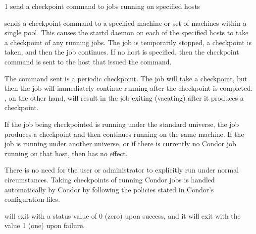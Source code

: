 \begin{ManPage}{\label{man-condor-checkpoint}}{1}
{send a checkpoint command to jobs running on specified hosts}
\Synopsis {}
\ToolArgsBase \ToolArgsLocate


\Description
{} sends a checkpoint command to a specified
machine or set of machines within a single pool.
This causes the startd daemon on each of the specified hosts to take a 
checkpoint of any running jobs. The job is temporarily
stopped, a checkpoint is taken, and then the job continues.
If no host is specified, then the checkpoint command
is sent to the host that issued the
 command.

The command sent is a
periodic checkpoint.
The job will take a checkpoint, but then the job will immediately
continue running
after the checkpoint is completed.
, on the other hand, will result in the job exiting
(vacating) after it produces a checkpoint. 

If the job being checkpointed is running under the standard universe,
the job produces a checkpoint and then continues running
on the same machine.
If the job is running under another universe,
or if there is currently no Condor job
running on that host, then  has no effect. 

There is no need for the user or administrator to explicitly
run  under normal circumstances.
Taking checkpoints of running Condor jobs is
handled automatically by Condor by following the policies
stated in Condor's configuration files. 

\begin{Options}
	\ToolArgsBaseDesc
	\ToolArgsLocateDesc
\end{Options}

\ExitStatus

 will exit with a status value of 0 (zero) upon success,
and it will exit with the value 1 (one) upon failure.

\end{ManPage}

